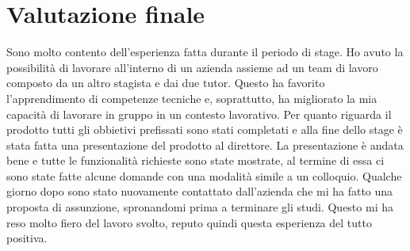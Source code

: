 \section{Valutazione finale}
Sono molto contento dell'esperienza fatta durante il periodo di stage. Ho avuto la possibilità di lavorare all'interno di un azienda assieme ad un team di lavoro composto da un altro stagista e dai due tutor. Questo ha favorito l'apprendimento di competenze tecniche e, soprattutto, ha migliorato la mia capacità di lavorare in gruppo in un contesto lavorativo. Per quanto riguarda il prodotto tutti gli obbietivi prefissati sono stati completati e alla fine dello stage è stata fatta una presentazione del prodotto al direttore. La presentazione è andata bene e tutte le funzionalità richieste sono state mostrate, al termine di essa ci sono state fatte alcune domande con una modalità simile a un colloquio. Qualche giorno dopo sono stato nuovamente contattato dall'azienda che mi ha fatto una proposta di assunzione, spronandomi prima a terminare gli studi. Questo mi ha reso molto fiero del lavoro svolto, reputo quindi questa esperienza del tutto positiva.